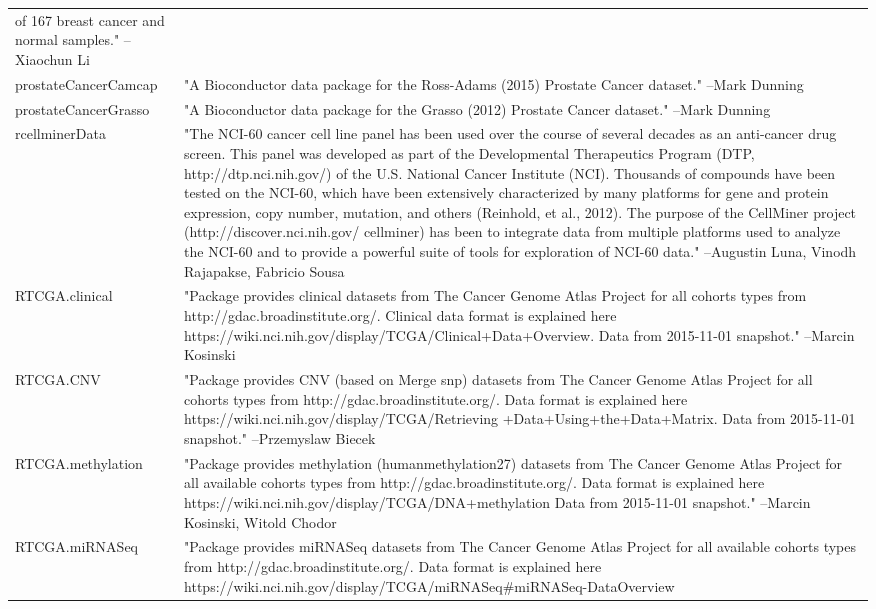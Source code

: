 \begin{longtable}[t]{l>{\raggedright\arraybackslash}p{25em}}
of 167 breast cancer and normal samples." --Xiaochun Li\\
\addlinespace
prostateCancerCamcap & "A Bioconductor data package for the Ross-Adams (2015)
Prostate Cancer dataset." --Mark Dunning\\
prostateCancerGrasso & "A Bioconductor data package for the Grasso (2012) Prostate
Cancer dataset." --Mark Dunning\\
rcellminerData & "The NCI-60 cancer cell line panel has been used over the
course of several decades as an anti-cancer drug screen. This
panel was developed as part of the Developmental Therapeutics
Program (DTP, http://dtp.nci.nih.gov/) of the U.S. National
Cancer Institute (NCI). Thousands of compounds have been tested
on the NCI-60, which have been extensively characterized by
many platforms for gene and protein expression, copy number,
mutation, and others (Reinhold, et al., 2012). The purpose of
the CellMiner project (http://discover.nci.nih.gov/ cellminer)
has been to integrate data from multiple platforms used to
analyze the NCI-60 and to provide a powerful suite of tools for
exploration of NCI-60 data." --Augustin Luna, Vinodh Rajapakse, Fabricio Sousa\\
RTCGA.clinical & "Package provides clinical datasets from The Cancer Genome
Atlas Project for all cohorts types from
http://gdac.broadinstitute.org/. Clinical data format is
explained here
https://wiki.nci.nih.gov/display/TCGA/Clinical+Data+Overview.
Data from 2015-11-01 snapshot." --Marcin Kosinski\\
RTCGA.CNV & "Package provides CNV (based on Merge snp) datasets from
The Cancer Genome Atlas Project for all cohorts types from
http://gdac.broadinstitute.org/. Data format is explained here
https://wiki.nci.nih.gov/display/TCGA/Retrieving
+Data+Using+the+Data+Matrix. Data from 2015-11-01 snapshot." --Przemyslaw Biecek\\
\addlinespace
RTCGA.methylation & "Package provides methylation (humanmethylation27) datasets
from The Cancer Genome Atlas Project for all available cohorts
types from http://gdac.broadinstitute.org/. Data format is
explained here
https://wiki.nci.nih.gov/display/TCGA/DNA+methylation Data from
2015-11-01 snapshot." --Marcin Kosinski, Witold Chodor\\
RTCGA.miRNASeq & "Package provides miRNASeq datasets from The Cancer Genome
Atlas Project for all available cohorts types from
http://gdac.broadinstitute.org/. Data format is explained here
https://wiki.nci.nih.gov/display/TCGA/miRNASeq\#miRNASeq-DataOverview

\end{longtable}
